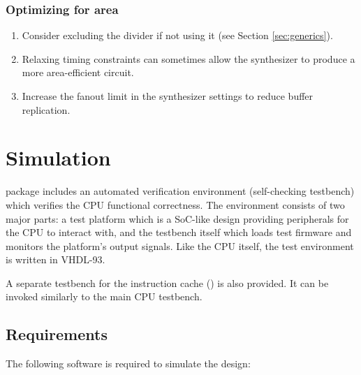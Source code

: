\documentclass[a4paper,12pt,twoside,extrafontsizes]{memoir}
\begin{document}
\subsection{Optimizing for area}

\begin{enumerate}
	\item Consider excluding the divider if not using it (see Section \ref{sec:generics}).
	
	\item Relaxing timing constraints can sometimes allow the synthesizer to produce a more area-efficient circuit.
	
	\item Increase the fanout limit in the synthesizer settings to reduce buffer replication.
\end{enumerate}

\chapter{Simulation}
\label{ch:simulation}

\lxp{} package includes an automated verification environment (self-checking testbench) which verifies the \lxp{} CPU functional correctness. The environment consists of two major parts: a test platform which is a SoC-like design providing peripherals for the CPU to interact with, and the testbench itself which loads test firmware and monitors the platform's output signals. Like the CPU itself, the test environment is written in VHDL-93.

A separate testbench for the instruction cache () is also provided. It can be invoked similarly to the main CPU testbench.

\section{Requirements}

The following software is required to simulate the \lxp{} design:
\end{document}
